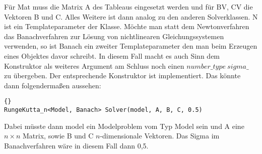 \documentclass[a4paper,11pt]{article}
\theoremstyle{definition}
\begin{document}
Für Mat muss die Matrix A des Tableaus eingesetzt werden und für BV, CV die Vektoren B und C. Alles Weitere ist dann analog zu den anderen Solverklassen. N ist ein Templateparameter der Klasse. Möchte man statt dem Newtonverfahren das Banachverfahren zur Lösung von nichtlinearen Gleichungssystemen verwenden, so ist Banach ein zweiter Templateparameter den man beim Erzeugen eines Objektes davor schreibt. In diesem Fall macht es auch Sinn dem Konstruktor als weiteres Argument am Schluss noch einen $number\_type \ sigma\_$ zu übergeben. Der entsprechende Konstruktor ist implementiert.
Das könnte dann folgendermaßen aussehen:
{\footnotesize{\begin{lstlisting}{}
RungeKutta_n<Model, Banach> Solver(model, A, B, C, 0.5)
\end{lstlisting}}}
Dabei müsste dann model ein Modelproblem vom Typ Model sein und A eine $n \times n$ Matrix, sowie B und C $n$-dimensionale Vektoren.
Das Sigma im Banachverfahren wäre in diesem Fall dann 0,5.
\end{document}

